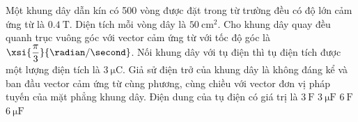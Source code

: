 \begin{ex}
	Một khung dây dẫn kín có 500 vòng được đặt trong từ trường đều có độ lớn cảm ứng từ là $\SI{0.4}{\tesla}$. Diện tích mỗi vòng dây là $\SI{50}{\centi\meter^2}$. Cho khung dây quay đều quanh trục vuông góc với vector cảm ứng từ với tốc độ góc là $\xsi{\dfrac{\pi}{3}}{\radian/\second}$. Nối khung dây với tụ điện thì tụ điện tích được một lượng điện tích là $\SI{3}{\micro\coulomb}$. Giả sử điện trở của khung dây là không đáng kể và ban đầu vector cảm ứng từ cùng phương, cùng chiều với vector đơn vị pháp tuyến của mặt phẳng khung dây. Điện dung của tụ điện có giá trị là 
	\choice
	{$\SI{3}{\farad}$}
	{$\SI{3}{\micro\farad}$}
	{$\SI{6}{\farad}$}
	{\True $\SI{6}{\micro\farad}$}
\end{ex}

